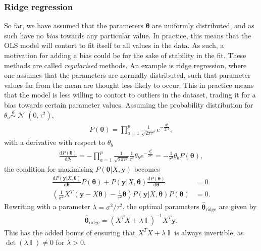 \documentclass[twocolumn,english,notitlepage]{article}
\renewcommand{\d}[2][x]{\ensuremath{\frac{\mathrm{d}#2}{\mathrm{d}#1}}}
\renewcommand{\vec}[1]{\boldsymbol{#1}}
\newcommand{\pclosed}[1]{\left(#1\right)}
\renewcommand{\exp}[1]{e^{#1}}
\newcommand{\normal}[2]{\operatorname{\mathcal{N}}\pclosed{#1,#2}}
\newcommand{\distas}{\overset{d}{\sim}}
\DeclareMathOperator{\eye}{\mathbb{I}}
\newcommand{\msub}[2]{\ensuremath{{#1}_\text{#2}}}
\begin{document}
        \subsubsection{Ridge regression}
            So far, we have assumed that the parameters $\vec{\theta}$ are uniformly distributed, and as such have no \textit{bias} towards any particular value. In practice, this means that the OLS model will contort to fit itself to all values in the data. As such, a motivation for adding a bias could be for the sake of stability in the fit. These methods are called \textit{regularised} methods. An example is ridge regression, where one assumes that the parameters are normally distributed, such that parameter values far from the mean are thought less likely to occur. This in practice means that the model is less willing to contort to outliers in the dataset, trading it for a bias towards certain parameter values. Assuming the probability distribution for $\theta_a \distas \normal{0}{\tau^2}$,
            \begin{align}
                P(\vec{\theta}) = \prod_{a=1}^{p} \frac{1}{\sqrt{2\pi\tau^2}} \exp{-\frac{\theta_a^2}{2\tau^2}},
            \end{align}
            with a derivative with respect to $\theta_b$
            \begin{align}
                \d[\theta_b]{P(\vec{\theta})} = -\prod_{a=1}^{p} \frac{1}{\sqrt{2\pi\tau^2}} \frac{1}{\tau^2} \theta_b \exp{-\frac{\theta_a^2}{2\tau^2}} = -\frac{1}{\tau^2} \theta_b P(\vec{\theta}),
            \end{align}
            the condition for maximising $P(\vec{\theta}|X, \vec{y})$ becomes
            \begin{align} \nonumber
                \d[\vec{\theta}]{P(\vec{y}|X, \vec{\theta})} P(\vec{\theta}) + P(\vec{y}|X, \vec{\theta}) \d[\vec{\theta}]{P(\vec{\theta})} &= 0 \\
                \pclosed{ \frac{1}{\sigma^2} X^T(\vec{y}-X\vec{\theta}) - \frac{1}{\tau^2} \vec{\theta} } P(\vec{y}|X,\vec{\theta}) P(\vec{\theta}) &= 0.
            \end{align}
            Rewriting with a parameter $\lambda = \sigma^2/\tau^2$, the optimal parameters $\msub{\vec{\hat{\theta}}}{ridge}$ are given by
            \begin{align}
                \boxed{
                \msub{\vec{\hat{\theta}}}{ridge} = \pclosed{X^TX + \lambda \eye}^{-1} X^T \vec{y}.
                \label{theo:eq:Ridge_coefs}
                }
            \end{align}
            This has the added bonus of ensuring that $X^TX + \lambda \eye$ is always invertible, as $\det(\lambda \eye) \neq 0$ for $\lambda>0$.
\end{document}
